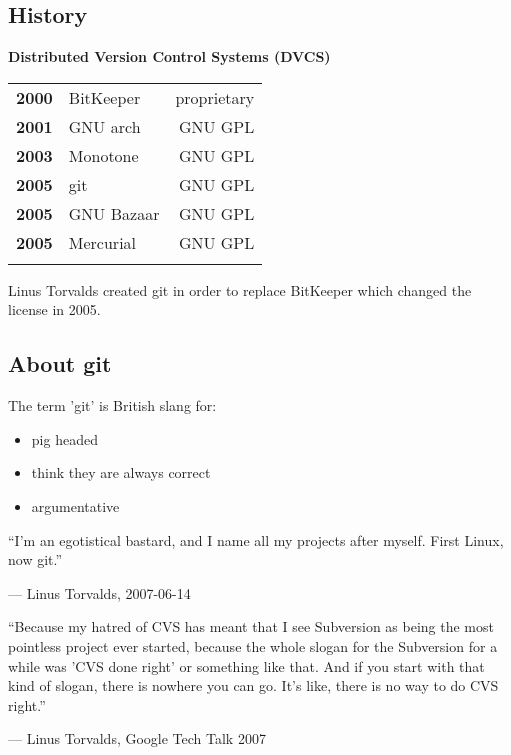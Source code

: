 \subsection{History}
\begin{frame}
  \subslidetitle
  \textbf{Distributed Version Control Systems (DVCS)}
  \pause
  \\
  \begin{tabular}{lp{6cm}r}
    \textbf{2000} & BitKeeper  & proprietary \\
    \pause
    \textbf{2001} & GNU arch   & GNU GPL \\
    \pause
    \textbf{2003} & Monotone   & GNU GPL \\
    \pause
    \textbf{2005} & git & GNU GPL \\
    \pause
    \textbf{2005} & GNU Bazaar & GNU GPL \\
    \pause
    \textbf{2005} & Mercurial  & GNU GPL \\
    \pause
  \end{tabular}

  Linus Torvalds created git in order to replace BitKeeper which changed the license in 2005.
\end{frame}

\subsection{About git}
\begin{frame}
  \subslidetitle
   The term 'git' is British slang for:
  \begin{itemize}
    \item pig headed
    \item think they are always correct
    \item argumentative
  \end{itemize}

  \pause
  \epigraph{``I'm an egotistical bastard, and I name all my projects after myself. First Linux, now git.''}
       {--- Linus Torvalds, 2007-06-14}
  \pause
  \epigraph{``Because my hatred of CVS has meant that I see Subversion as being the most pointless project ever started, because the whole slogan for the Subversion for a while was 'CVS done right' or something like that. And if you start with that kind of slogan, there is nowhere you can go. It's like, there is no way to do CVS right.''}
      {--- Linus Torvalds, Google Tech Talk 2007}
\end{frame}

